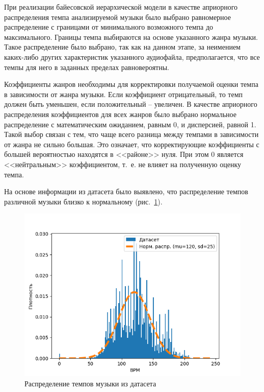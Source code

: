 При реализации байесовской иерархической модели в качестве априорного распределения темпа анализируемой музыки было выбрано равномерное распределение с границами от минимального возможного темпа до максимального. Границы темпа выбираются на основе указанного жанра музыки. Такое распределение было выбрано, так как на данном этапе, за неимением каких-либо других характеристик указанного аудиофайла, предполагается, что все темпы для него в заданных пределах равновероятны.

Коэффициенты жанров необходимы для корректировки получаемой оценки темпа в зависимости от жанра музыки. Если коэффициент отрицательный, то темп должен быть уменьшен, если положительный -- увеличен. В качестве априорного распределения коэффициентов для всех жанров было выбрано нормальное распределение с математическим ожиданием, равным 0, и дисперсией, равной 1. Такой выбор связан с тем, что чаще всего разница между темпами в зависимости от жанра не сильно большая. Это означает, что корректирующие коэффициенты с большей вероятностью находятся в <<районе>> нуля. При этом 0 является <<нейтральным>> коэффициентом, т.~е. не влияет на полученную оценку темпа.

На основе информации из датасета было выявлено, что распределение темпов различной музыки близко к нормальному (рис.~\ref{img:bpm_distribution}).

\begin{figure}[h]
	\centering
	\includegraphics[scale=0.7]{../graphs/bpm_distribution.png}
	\caption{Распределение темпов музыки из датасета}
	\label{img:bpm_distribution}
\end{figure}

